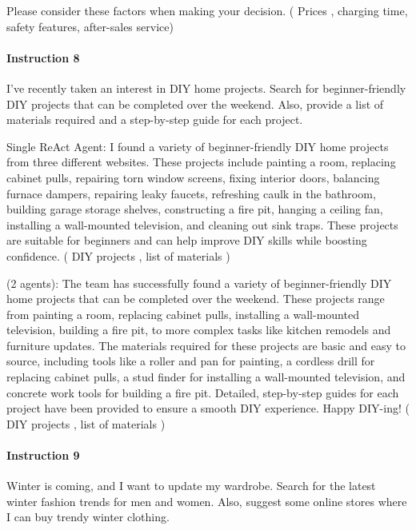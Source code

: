 Please consider these factors when making your decision. ({\color{teal} Prices \cmark}, {\color{teal} charging time}, {\color{teal} safety features}, {\color{teal} after-sales service})

\paragraph{Instruction 8} I've recently taken an interest in DIY home projects. Search for beginner-friendly DIY projects that can be completed over the weekend. Also, provide a list of materials required and a step-by-step guide for each project.

{\color{blue} Single ReAct Agent}: I found a variety of beginner-friendly DIY home projects from three different websites. These projects include painting a room, replacing cabinet pulls, repairing torn window screens, fixing interior doors, balancing furnace dampers, repairing leaky faucets, refreshing caulk in the bathroom, building garage storage shelves, constructing a fire pit, hanging a ceiling fan, installing a wall-mounted television, and cleaning out sink traps. These projects are suitable for beginners and can help improve DIY skills while boosting confidence. ({\color{teal} DIY projects \cmark}, {\color{red} list of materials \xmark})

{\color{magenta} \framework (2 agents)}: The team has successfully found a variety of beginner-friendly DIY home projects that can be completed over the weekend. These projects range from painting a room, replacing cabinet pulls, installing a wall-mounted television, building a fire pit, to more complex tasks like kitchen remodels and furniture updates. The materials required for these projects are basic and easy to source, including tools like a roller and pan for painting, a cordless drill for replacing cabinet pulls, a stud finder for installing a wall-mounted television, and concrete work tools for building a fire pit. Detailed, step-by-step guides for each project have been provided to ensure a smooth DIY experience. Happy DIY-ing! ({\color{teal} DIY projects \cmark}, {\color{teal} list of materials \cmark})

\paragraph{Instruction 9} Winter is coming, and I want to update my wardrobe. Search for the latest winter fashion trends for men and women. Also, suggest some online stores where I can buy trendy winter clothing.

